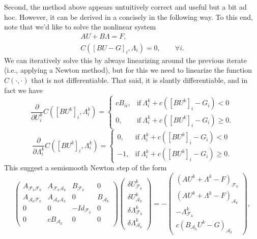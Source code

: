 \documentclass{article}
\begin{document}
Second, the method above appears untuitively correct and useful but a bit ad
hoc. However, it can be derived in a concisely in the following way. To this
end, note that we'd like to solve the nonlinear system
\begin{eqnarray*}
 &A U + B\Lambda = F,&\\
 &C([BU-G]_i, \Lambda_i) = 0,
\qquad \forall i.&
\end{eqnarray*}
We can iteratively solve this by always linearizing around the previous
iterate (i.e., applying a Newton method), but for this we need to linearize
the function $C(\cdot,\cdot)$ that is not differentiable. That said, it is
slantly differentiable, and in fact we have
\begin{equation*}
 \dfrac{\partial}{\partial U^k_i}C([BU^k]_i,\Lambda^k_i) = \begin{cases}
                                   cB_{ii},& \text{if}\ \Lambda^k_i + c([BU^k]_i - G_i)< 0\\
                                   0,& \text{if}\ \Lambda^k_i + c([BU^k]_i - G_i)\geq 0.
                                  \end{cases}
\end{equation*}
\begin{equation*}
 \dfrac{\partial}{\partial\Lambda^k_i}C([BU^k]_i,\Lambda^k_i) = \begin{cases}
                                   0,& \text{if}\ \Lambda^k_i + c([BU^k]_i - G_i)< 0\\
                                   -1,& \text{if}\ \Lambda^k_i + c([BU^k]_i - G_i)\geq 0.
                                  \end{cases}
\end{equation*}
This suggest a semismooth Newton step of the form
\begin{equation*}
 \begin{pmatrix}
 A_{\mathcal{F}_k\mathcal{F}_k} & A_{\mathcal{F}_k\mathcal{A}_k} & B_{\mathcal{F}_k} & 0\\
 A_{\mathcal{A}_k\mathcal{F}_k} & A_{\mathcal{A}_k\mathcal{A}_k} & 0 & B_{\mathcal{A}_k}\\
 0 & 0 & -Id_{\mathcal{F}_k} & 0\\
 0 & cB_{\mathcal{A}_k} & 0 & 0
\end{pmatrix}
\begin{pmatrix}
 \delta U^k_{\mathcal{F}_k}\\ \delta U^k_{\mathcal{A}_k}\\ \delta \Lambda^k_{\mathcal{F}_k}\\ \delta \Lambda^k_{\mathcal{A}_k}
\end{pmatrix}
=
-\begin{pmatrix}
 (AU^k + \Lambda^k - F)_{\mathcal{F}_k}\\ (AU^k + \Lambda^k - F)_{\mathcal{A}_k}\\ -\Lambda^k_{\mathcal{F}_k}\\ c(B_{\mathcal{A}_k} U^k - G)_{\mathcal{A}_k}
\end{pmatrix},
\end{equation*}
\end{document}
